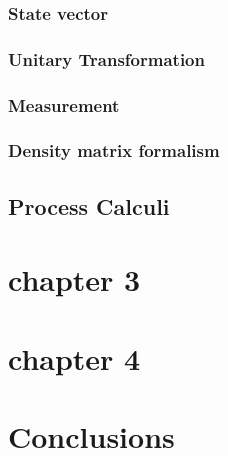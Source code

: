 \documentclass[10pt,a4paper, titlepage]{report}
\theoremstyle{definition}
\begin{document}
\subsection{State vector}
\subsection{Unitary Transformation}
\subsection{Measurement}
\subsection{Density matrix formalism}

\section{Process Calculi}	

\chapter{chapter 3}
\chapter{chapter 4}

\chapter{Conclusions}
\printbibliography[
heading=bibintoc,
title={Bibliography}
]
\end{document}
